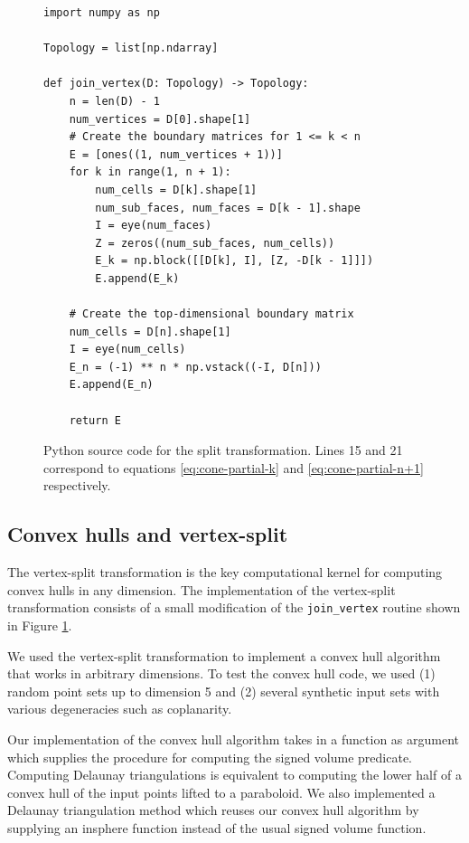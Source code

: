 \documentclass[twocolumn,leqno,twocolumn]{article}
\begin{document}
\begin{figure}
    \begin{verbatim}
import numpy as np

Topology = list[np.ndarray]

def join_vertex(D: Topology) -> Topology:
    n = len(D) - 1
    num_vertices = D[0].shape[1]
    # Create the boundary matrices for 1 <= k < n
    E = [ones((1, num_vertices + 1))]
    for k in range(1, n + 1):
        num_cells = D[k].shape[1]
        num_sub_faces, num_faces = D[k - 1].shape
        I = eye(num_faces)
        Z = zeros((num_sub_faces, num_cells))
        E_k = np.block([[D[k], I], [Z, -D[k - 1]]])
        E.append(E_k)

    # Create the top-dimensional boundary matrix
    num_cells = D[n].shape[1]
    I = eye(num_cells)
    E_n = (-1) ** n * np.vstack((-I, D[n]))
    E.append(E_n)

    return E
    \end{verbatim}
    \caption{Python source code for the split transformation.
    Lines 15 and 21 correspond to equations \eqref{eq:cone-partial-k} and \eqref{eq:cone-partial-n+1} respectively.}
    \label{fig:join-vertex-source-code}
\end{figure}

\subsection{Convex hulls and vertex-split}

The vertex-split transformation is the key computational kernel for computing convex hulls in any dimension.
The implementation of the vertex-split transformation consists of a small modification of the \texttt{join\_vertex} routine shown in Figure \ref{fig:join-vertex-source-code}.

We used the vertex-split transformation to implement a convex hull algorithm that works in arbitrary dimensions.
To test the convex hull code, we used (1) random point sets up to dimension 5 and (2) several synthetic input sets with various degeneracies such as coplanarity.

Our implementation of the convex hull algorithm takes in a function as argument which supplies the procedure for computing the signed volume predicate.
Computing Delaunay triangulations is equivalent to computing the lower half of a convex hull of the input points lifted to a paraboloid.
We also implemented a Delaunay triangulation method which reuses our convex hull algorithm by supplying an insphere function instead of the usual signed volume function.
\end{document}
